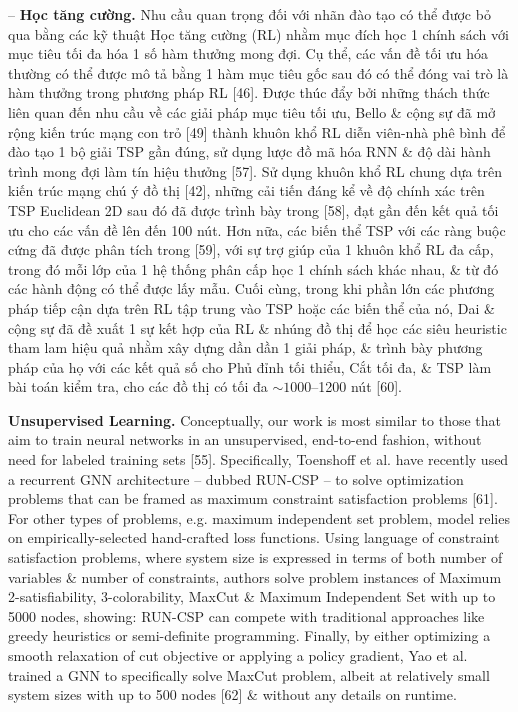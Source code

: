 \documentclass{article}
\begin{document}
\begin{itemize}
    -- {\bf Học tăng cường.} Nhu cầu quan trọng đối với nhãn đào tạo có thể được bỏ qua bằng các kỹ thuật Học tăng cường (RL) nhằm mục đích học 1 chính sách với mục tiêu tối đa hóa 1 số hàm thưởng mong đợi. Cụ thể, các vấn đề tối ưu hóa thường có thể được mô tả bằng 1 hàm mục tiêu gốc sau đó có thể đóng vai trò là hàm thưởng trong phương pháp RL [46]. Được thúc đẩy bởi những thách thức liên quan đến nhu cầu về các giải pháp mục tiêu tối ưu, Bello \& cộng sự đã mở rộng kiến trúc mạng con trỏ [49] thành khuôn khổ RL diễn viên-nhà phê bình để đào tạo 1 bộ giải TSP gần đúng, sử dụng lược đồ mã hóa RNN \& độ dài hành trình mong đợi làm tín hiệu thưởng [57]. Sử dụng khuôn khổ RL chung dựa trên kiến trúc mạng chú ý đồ thị [42], những cải tiến đáng kể về độ chính xác trên TSP Euclidean 2D sau đó đã được trình bày trong [58], đạt gần đến kết quả tối ưu cho các vấn đề lên đến 100 nút. Hơn nữa, các biến thể TSP với các ràng buộc cứng đã được phân tích trong [59], với sự trợ giúp của 1 khuôn khổ RL đa cấp, trong đó mỗi lớp của 1 hệ thống phân cấp học 1 chính sách khác nhau, \& từ đó các hành động có thể được lấy mẫu. Cuối cùng, trong khi phần lớn các phương pháp tiếp cận dựa trên RL tập trung vào TSP hoặc các biến thể của nó, Dai \& cộng sự đã đề xuất 1 sự kết hợp của RL \& nhúng đồ thị để học các siêu heuristic tham lam hiệu quả nhằm xây dựng dần dần 1 giải pháp, \& trình bày phương pháp của họ với các kết quả số cho Phủ đỉnh tối thiểu, Cắt tối đa, \& TSP làm bài toán kiểm tra, cho các đồ thị có tối đa $\sim1000$--1200 nút [60].

    {\bf Unsupervised Learning.} Conceptually, our work is most similar to those that aim to train neural networks in an unsupervised, end-to-end fashion, without need for labeled training sets [55]. Specifically, Toenshoff et al. have recently used a recurrent GNN architecture -- dubbed RUN-CSP -- to solve optimization problems that can be framed as maximum constraint satisfaction problems [61]. For other types of problems, e.g. maximum independent set problem, model relies on empirically-selected hand-crafted loss functions. Using language of constraint satisfaction problems, where system size is expressed in terms of both number of variables \& number of constraints, authors solve problem instances of Maximum 2-satisfiability, 3-colorability, MaxCut \& Maximum Independent Set with up to 5000 nodes, showing: RUN-CSP can compete with traditional approaches like greedy heuristics or semi-definite programming. Finally, by either optimizing a smooth relaxation of cut objective or applying a policy gradient, Yao et al. trained a GNN to specifically solve MaxCut problem, albeit at relatively small system sizes with up to 500 nodes [62] \& without any details on runtime.


\end{itemize}
\end{document}
